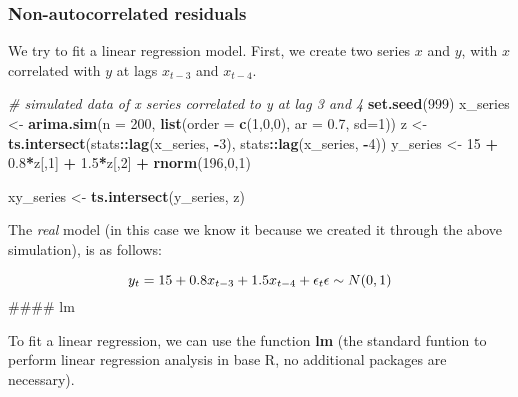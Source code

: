 \documentclass[
]{article}
\newenvironment{Shaded}{\begin{snugshade}}{\end{snugshade}}
\newcommand{\AttributeTok}[1]{\textcolor[rgb]{0.13,0.29,0.53}{#1}}
\newcommand{\CommentTok}[1]{\textcolor[rgb]{0.56,0.35,0.01}{\textit{#1}}}
\newcommand{\DecValTok}[1]{\textcolor[rgb]{0.00,0.00,0.81}{#1}}
\newcommand{\FloatTok}[1]{\textcolor[rgb]{0.00,0.00,0.81}{#1}}
\newcommand{\FunctionTok}[1]{\textcolor[rgb]{0.13,0.29,0.53}{\textbf{#1}}}
\newcommand{\NormalTok}[1]{#1}
\newcommand{\OtherTok}[1]{\textcolor[rgb]{0.56,0.35,0.01}{#1}}
\newcommand{\SpecialCharTok}[1]{\textcolor[rgb]{0.81,0.36,0.00}{\textbf{#1}}}
\begin{document}
\subsubsection{Non-autocorrelated residuals}\label{non-autocorrelated-residuals}

We try to fit a linear regression model. First, we create two series \(x\) and \(y\), with \(x\) correlated with \(y\) at lags \(x_{t-3}\) and \(x_{t-4}\).

\begin{Shaded}
\begin{Highlighting}[]
\CommentTok{\# simulated data of x series correlated to y at lag 3 and 4}
\FunctionTok{set.seed}\NormalTok{(}\DecValTok{999}\NormalTok{)}
\NormalTok{x\_series }\OtherTok{\textless{}{-}} \FunctionTok{arima.sim}\NormalTok{(}\AttributeTok{n =} \DecValTok{200}\NormalTok{, }\FunctionTok{list}\NormalTok{(}\AttributeTok{order =} \FunctionTok{c}\NormalTok{(}\DecValTok{1}\NormalTok{,}\DecValTok{0}\NormalTok{,}\DecValTok{0}\NormalTok{), }\AttributeTok{ar =} \FloatTok{0.7}\NormalTok{, }\AttributeTok{sd=}\DecValTok{1}\NormalTok{))}
\NormalTok{z }\OtherTok{\textless{}{-}} \FunctionTok{ts.intersect}\NormalTok{(stats}\SpecialCharTok{::}\FunctionTok{lag}\NormalTok{(x\_series, }\SpecialCharTok{{-}}\DecValTok{3}\NormalTok{), stats}\SpecialCharTok{::}\FunctionTok{lag}\NormalTok{(x\_series, }\SpecialCharTok{{-}}\DecValTok{4}\NormalTok{)) }
\NormalTok{y\_series }\OtherTok{\textless{}{-}} \DecValTok{15} \SpecialCharTok{+} \FloatTok{0.8}\SpecialCharTok{*}\NormalTok{z[,}\DecValTok{1}\NormalTok{] }\SpecialCharTok{+} \FloatTok{1.5}\SpecialCharTok{*}\NormalTok{z[,}\DecValTok{2}\NormalTok{] }\SpecialCharTok{+} \FunctionTok{rnorm}\NormalTok{(}\DecValTok{196}\NormalTok{,}\DecValTok{0}\NormalTok{,}\DecValTok{1}\NormalTok{)}

\NormalTok{xy\_series }\OtherTok{\textless{}{-}} \FunctionTok{ts.intersect}\NormalTok{(y\_series, z)}
\end{Highlighting}
\end{Shaded}

The \emph{real} model (in this case we know it because we created it through the above simulation), is as follows:

\[
y_t = 15 + 0.8x_{t-3} + 1.5x_{t-4} + \epsilon_t \\
\epsilon \sim N(0, 1)
\]
\#\#\#\# lm

To fit a linear regression, we can use the function \textbf{lm} (the standard funtion to perform linear regression analysis in base R, no additional packages are necessary).
\end{document}
